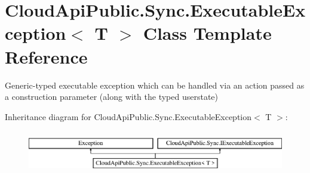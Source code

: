 \hypertarget{class_cloud_api_public_1_1_sync_1_1_executable_exception_3_01_t_01_4}{\section{Cloud\-Api\-Public.\-Sync.\-Executable\-Exception$<$ T $>$ Class Template Reference}
\label{class_cloud_api_public_1_1_sync_1_1_executable_exception_3_01_t_01_4}
}


Generic-\/typed executable exception which can be handled via an action passed as a construction parameter (along with the typed userstate)  


Inheritance diagram for Cloud\-Api\-Public.\-Sync.\-Executable\-Exception$<$ T $>$\-:\begin{figure}[H]
\begin{center}
\leavevmode
\includegraphics[height=1.917808cm]{class_cloud_api_public_1_1_sync_1_1_executable_exception_3_01_t_01_4}
\end{center}
\end{figure}
